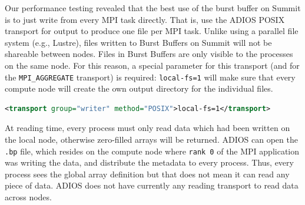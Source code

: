 Our performance testing revealed that the best use of the burst buffer on Summit is to just write from every MPI task directly. That is, use the ADIOS POSIX transport for output to produce one file per MPI task. Unlike using a parallel file system (e.g., Lustre), files written to Burst Buffers on Summit will not be shareable between nodes. Files in Burst Buffers are only visible to the processes on the same node. For this reason, a special parameter for this transport (and for the \verb+MPI_AGGREGATE+ transport) is required: \verb+local-fs=1+ will make sure that every compute node will create the own output directory for the individual files. 

\begin{lstlisting}[language=XML]
<transport group="writer" method="POSIX">local-fs=1</transport>
\end{lstlisting}

At reading time, every process must only read data which had been written on the local node, otherwise zero-filled arrays will be returned. ADIOS can open the \verb+.bp+ file, which resides on the compute node where \verb+rank 0+ of the MPI application was writing the data, and distribute the metadata to every process. Thus, every process sees the global array definition but that does not mean it can read any piece of data. ADIOS does not have currently any reading transport to read data across nodes. 

